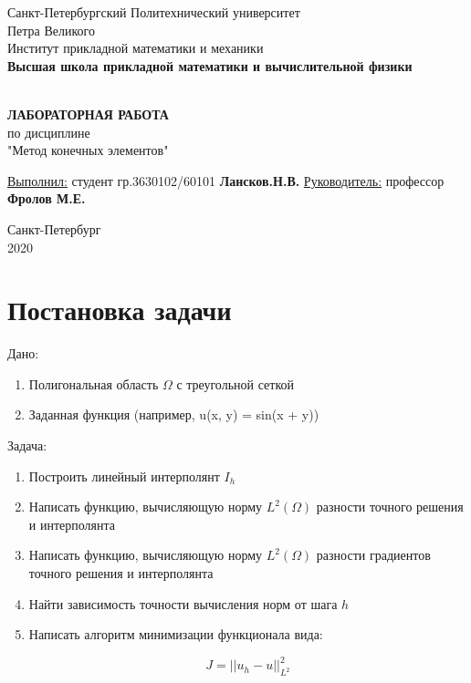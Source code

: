 \documentclass[12pt]{article}
\renewcommand{\listoffigures}{\begingroup  %
\tocsection
\tocfile{\listfigurename}{lof}
\endgroup}
\renewcommand{\listoftables}{\begingroup  %
\tocsection
\tocfile{\listtablename}{lot}
\endgroup}
\begin{document}
\begin{titlepage}
	\center
		Санкт-Петербургский Политехнический 
		университет \\ Петра Великого\\
		Институт прикладной математики и механики
		\\ \textbf{Высшая школа прикладной математики и вычислительной физики}

	\vfill ~
	\textbf{
		\\ \large ЛАБОРАТОРНАЯ РАБОТА
	}
	\\ по дисциплине
	\\ "Метод конечных элементов"
	\vfill ~
    
    
    \begin{flushleft}
    \underline{Выполнил:}  \hspace{\fill} студент гр.3630102/60101 \textbf{Лансков.Н.В.} \linebreak[2]
	\underline{Руководитель:} \hspace{\fill} профессор \textbf{Фролов М.Е.} \\ 
    \end{flushleft}
    

\vfill

{\large}	Санкт-Петербург
\\ 2020
\end{titlepage}


\tableofcontents
\listoffigures
\listoftables
\pagebreak


\section{Постановка задачи}

\quad  Дано:
\begin{enumerate}
\item Полигональная область $\Omega$ с треугольной сеткой
\item Заданная функция (например, u(x, y) = sin(x + y))
\end{enumerate} 

Задача:

\begin{enumerate}
\item Построить линейный интерполянт $I_h$
\item Написать функцию, вычисляющую норму $L^2(\Omega)$ разности точного решения и интерполянта
\item Написать функцию, вычисляющую норму $L^2(\Omega)$ разности градиентов точного решения и интерполянта 
\item Найти зависимость точности вычисления норм от шага $h$
\item Написать алгоритм минимизации функционала вида:

\begin{equation}
J = ||u_h - u||_{L^2}^2
\end{equation}

\end{enumerate} 
\end{document}
